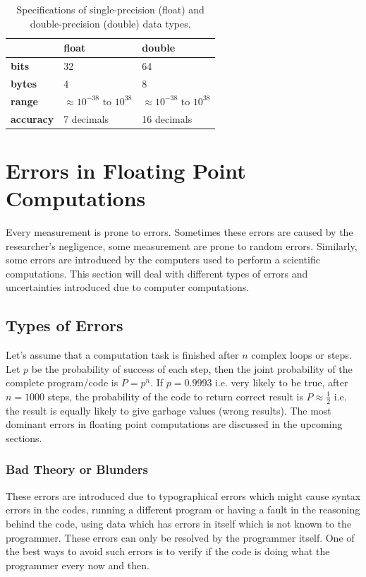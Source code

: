 \documentclass[a4,12pt]{article}
\numberwithin{equation}{subsection}
\begin{document}
\begin{table}[h]
\centering
\begin{tabular}{|l|l|l|}
\hline
         & \textbf{float}                         & \textbf{double}                         \\
         \hline
\textbf{bits}     & 32                                     & 64                                      \\
\textbf{bytes}    & 4                                      & 8                                       \\
\textbf{range}    & $\approx 10^{-38} \text{ to } 10^{38}$ & $ \approx 10^{-38} \text{ to } 10^{38}$ \\
\textbf{accuracy} & 7 decimals                             & 16 decimals \\
\hline                           
\end{tabular}
\caption{Specifications of single-precision (float) and double-precision (double) data types.}
\label{tab:tabel1}
\end{table}

\section{Errors in Floating Point Computations}
Every measurement is prone to errors. Sometimes these errors are caused by the researcher's negligence, some measurement are prone to random errors. Similarly, some errors are introduced by the computers used to perform a scientific computations. This section will deal with different types of errors and uncertainties introduced due to computer computations.

\subsection{Types of Errors}
Let's assume that a computation task is finished after $n$ complex loops or steps. Let $p$ be the probability of success of each step, then the joint probability of the complete program/code is $P=p^{n}$. If $p = 0.9993$ i.e. very likely to be true, after $n=1000$ steps, the probability of the code to return correct result is $P \approx \frac{1}{2}$ i.e. the result is equally likely to give garbage values (wrong results). The most dominant errors in floating point computations are discussed in the upcoming sections.

\subsubsection{Bad Theory or Blunders}
These errors are introduced due to typographical errors which might cause syntax errors in the codes, running a different program or having a fault in the reasoning behind the code, using data which has errors in itself which is not known to the programmer. These errors can only be resolved by the programmer itself. One of the best ways to avoid such errors is to verify if the code is doing what the programmer every now and then.
\end{document}
